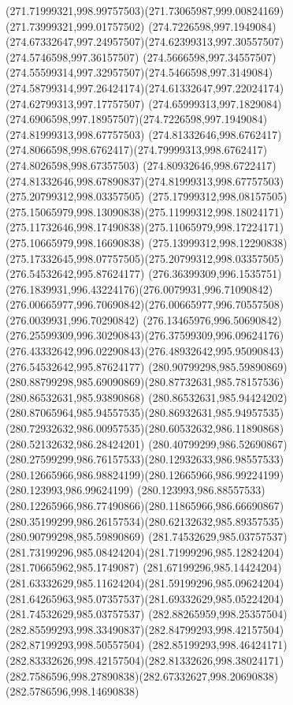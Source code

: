 {{\curveto(271.71999321,998.99757503)(271.73065987,999.00824169)(271.73999321,999.01757502)
\moveto(274.7226598,997.1949084)
\curveto(274.67332647,997.24957507)(274.62399313,997.30557507)(274.5746598,997.36157507)
\curveto(274.5666598,997.34557507)(274.55599314,997.32957507)(274.5466598,997.3149084)
\curveto(274.58799314,997.26424174)(274.61332647,997.22024174)(274.62799313,997.17757507)
\curveto(274.65999313,997.1829084)(274.6906598,997.18957507)(274.7226598,997.1949084)
\moveto(274.81999313,998.67757503)
\curveto(274.81332646,998.6762417)(274.8066598,998.6762417)(274.79999313,998.6762417)
\lineto(274.8026598,998.67357503)
\curveto(274.80932646,998.6722417)(274.81332646,998.67890837)(274.81999313,998.67757503)
\moveto(275.20799312,998.03357505)
\curveto(275.17999312,998.08157505)(275.15065979,998.13090838)(275.11999312,998.18024171)
\curveto(275.11732646,998.17490838)(275.11065979,998.17224171)(275.10665979,998.16690838)
\curveto(275.13999312,998.12290838)(275.17332645,998.07757505)(275.20799312,998.03357505)
\moveto(276.54532642,995.87624177)
\curveto(276.36399309,996.1535751)(276.1839931,996.43224176)(276.0079931,996.71090842)
\curveto(276.00665977,996.70690842)(276.00665977,996.70557508)(276.0039931,996.70290842)
\curveto(276.13465976,996.50690842)(276.25599309,996.30290843)(276.37599309,996.09624176)
\curveto(276.43332642,996.02290843)(276.48932642,995.95090843)(276.54532642,995.87624177)
\moveto(280.90799298,985.59890869)
\curveto(280.88799298,985.69090869)(280.87732631,985.78157536)(280.86532631,985.93890868)
\curveto(280.86532631,985.94424202)(280.87065964,985.94557535)(280.86932631,985.94957535)
\curveto(280.72932632,986.00957535)(280.60532632,986.11890868)(280.52132632,986.28424201)
\curveto(280.40799299,986.52690867)(280.27599299,986.76157533)(280.12932633,986.98557533)
\curveto(280.12665966,986.98824199)(280.12665966,986.99224199)(280.123993,986.99624199)
\curveto(280.123993,986.88557533)(280.12265966,986.77490866)(280.11865966,986.66690867)
\curveto(280.35199299,986.26157534)(280.62132632,985.89357535)(280.90799298,985.59890869)
\moveto(281.74532629,985.03757537)
\curveto(281.73199296,985.08424204)(281.71999296,985.12824204)(281.70665962,985.1749087)
\curveto(281.67199296,985.14424204)(281.63332629,985.11624204)(281.59199296,985.09624204)
\curveto(281.64265963,985.07357537)(281.69332629,985.05224204)(281.74532629,985.03757537)
\moveto(282.88265959,998.25357504)
\curveto(282.85599293,998.33490837)(282.84799293,998.42157504)(282.87199293,998.50557504)
\curveto(282.85199293,998.46424171)(282.83332626,998.42157504)(282.81332626,998.38024171)
\curveto(282.7586596,998.27890838)(282.67332627,998.20690838)(282.5786596,998.14690838)
}}
